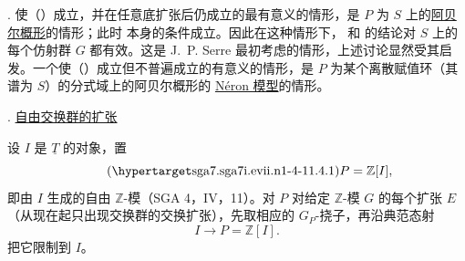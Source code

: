 
. 使（）成立，并在任意底扩张后仍成立的最有意义的情形，是 $P$ 为 $S$ 上的\underline{阿贝尔概形}的情形；此时  本身的条件成立。因此在这种情形下， 和  的结论对 $S$ 上的每个仿射群 $G$ 都有效。这是 J.~P. Serre 最初考虑的情形，上述讨论显然受其启发。一个使（）成立但不普遍成立的有意义的情形，是 $P$ 为某个离散赋值环（其谱为 $S$）的分式域上的阿贝尔概形的 \underline{N\'eron 模型}的情形。




. \underline{自由交换群的扩张}

设 $I$ 是 $\underline T$ 的对象，置
\begin{equation}\tag{\SGARefTarget{sga7.sga7i.evii.n1-4-1}{1.4.1}}
 P=\mathbb Z[I],
\end{equation}
即由 $I$ 生成的自由 $\mathbb Z$-模（SGA 4，IV，11）。对 $P$ 对给定 $\mathbb Z$-模 $G$ 的每个扩张 $E$（从现在起只出现交换群的交换扩张），先取相应的 $G_P$-挠子，再沿典范态射
\[
 I\longrightarrow P=\mathbb Z[I].
\]
把它限制到 $I$。


